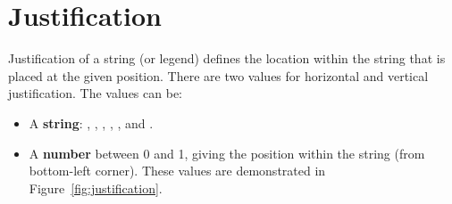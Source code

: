 \section{Justification}
\label{sec:justification_spec}

Justification of a string (or legend) defines the location within the string that is placed at the given position.  There are two values for horizontal and vertical justification.  The values can be:   

\begin{itemize}
  \item A {\bf string}: , , , , , and .
  
  \item A {\bf number} between 0 and 1, giving the position within the string (from bottom-left corner).  These values are demonstrated in Figure~\ref{fig:justification}.
\end{itemize}

